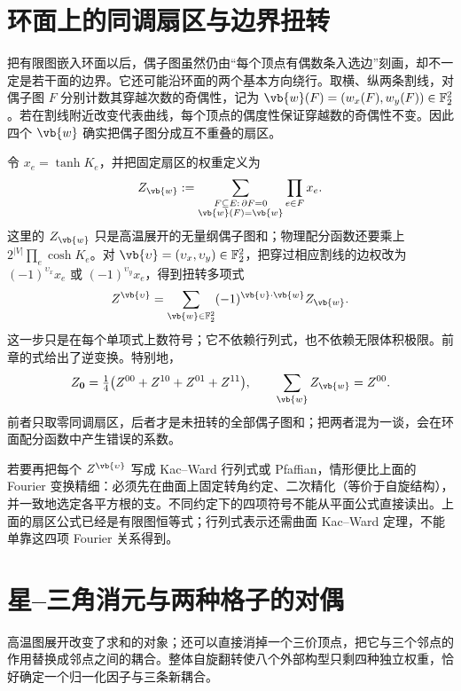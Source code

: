 \section{环面上的同调扇区与边界扭转}
\label{sec:phys-sm-torus-twists}
把有限图嵌入环面以后，偶子图虽然仍由“每个顶点有偶数条入选边”刻画，却不一定是若干面的边界。它还可能沿环面的两个基本方向绕行。取横、纵两条割线，对偶子图 \(F\) 分别计数其穿越次数的奇偶性，记为
\(\vb{w}(F)=(w_x(F),w_y(F))\in\mathbb F_2^2\)。若在割线附近改变代表曲线，每个顶点的偶度性保证穿越数的奇偶性不变。因此四个 \(\vb{w}\) 确实把偶子图分成互不重叠的扇区。

令 \(x_e=\tanh K_e\)，并把固定扇区的权重定义为
\begin{equation}
 Z_{\vb{w}}:=\sum_{\substack{F\subseteq E:\,\partial F=0\\
                         \vb{w}(F)=\vb{w}}}\prod_{e\in F}x_e .
 \label{eq:phys-sm-torus-sector-defined}
\end{equation}
这里的 \(Z_{\vb{w}}\) 只是高温展开的无量纲偶子图和；物理配分函数还要乘上 \(2^{|V|}\prod_e\cosh K_e\)。对 \(\vb{\upsilon}=(\upsilon_x,\upsilon_y)\in\mathbb F_2^2\)，把穿过相应割线的边权改为 \((-1)^{\upsilon_x}x_e\) 或 \((-1)^{\upsilon_y}x_e\)，得到扭转多项式
\[
 Z^{\vb{\upsilon}}
 =\sum_{\vb{w}\in\mathbb F_2^2}
 (-1)^{\vb{\upsilon}\cdot\vb{w}}Z_{\vb{w}}.
\]
这一步只是在每个单项式上数符号；它不依赖行列式，也不依赖无限体积极限。前章的式给出了逆变换。特别地，
\[
 Z_{\mathbf 0}=\tfrac14\bigl(Z^{00}+Z^{10}+Z^{01}+Z^{11}\bigr),
 \qquad
 \sum_{\vb{w}}Z_{\vb{w}}=Z^{00}.
\]
前者只取零同调扇区，后者才是未扭转的全部偶子图和；把两者混为一谈，会在环面配分函数中产生错误的系数。

若要再把每个 \(Z^{\vb{\upsilon}}\) 写成 Kac--Ward 行列式或 Pfaffian，情形便比上面的 Fourier 变换精细：必须先在曲面上固定转角约定、二次精化（等价于自旋结构），并一致地选定各平方根的支。不同约定下的四项符号不能从平面公式直接读出。上面的扇区公式已经是有限图恒等式；行列式表示还需曲面 Kac--Ward 定理，不能单靠这四项 Fourier 关系得到。
\section{星--三角消元与两种格子的对偶}

高温图展开改变了求和的对象；还可以直接消掉一个三价顶点，把它与三个邻点的作用替换成邻点之间的耦合。整体自旋翻转使八个外部构型只剩四种独立权重，恰好确定一个归一化因子与三条新耦合。

